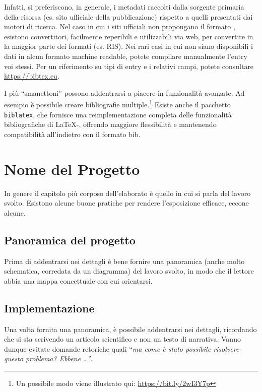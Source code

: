 \documentclass[12pt]{report}
\begin{document}
    Infatti, si preferiscono, in generale, i metadati raccolti dalla sorgente primaria della risorsa (es. sito ufficiale della pubblicazione) rispetto a quelli presentati dai motori di ricerca. Nel caso in cui i siti ufficiali non propongano il formato , esistono convertitori, facilmente reperibili e utilizzabili via web, per convertire in  la maggior parte dei formati (es. RIS). Nei rari casi in cui non siano disponibili i dati in alcun formato machine readable, potete compilare manualmente l'entry  voi stessi. Per un riferimento su tipi di entry e i relativi campi, potete consultare \url{https://bibtex.eu}.

    I pi\`u ``smanettoni'' possono addentrarsi a piacere in funzionalit\`a avanzate. Ad esempio \`e possibile creare bibliografie multiple.\footnote{Un possibile modo viene illustrato qui: \url{https://bit.ly/2wI3Y7p}}
    Esiste anche il pacchetto \texttt{biblatex}, che fornisce una reimplementazione completa delle funzionalit\`a bibliografiche di \LaTeX-, offrendo maggiore flessibilit\`a e mantenendo compatibilit\`a all'indietro con il formato bib.


%
%


    \chapter{Nome del Progetto}
    \label{cap4}

    In genere il capitolo più corposo dell'elaborato è quello in cui si parla del lavoro svolto. Esistono alcune buone pratiche per rendere l'esposizione efficace, eccone alcune.


    \section{Panoramica del progetto}

    Prima di addentrarsi nei dettagli è bene fornire una panoramica (anche molto schematica, corredata da un diagramma) del lavoro svolto, in modo che il lettore abbia una mappa concettuale con cui orientarsi.


    \section{Implementazione}

    Una volta fornita una panoramica, è possibile addentrarsi nei dettagli, ricordando che si sta scrivendo un articolo scientifico e non un testo di narrativa. Vanno dunque evitate domande retoriche quali ``\textit{ma come è stato possibile risolvere questo problema? Ebbene \ldots}''.
\end{document}
